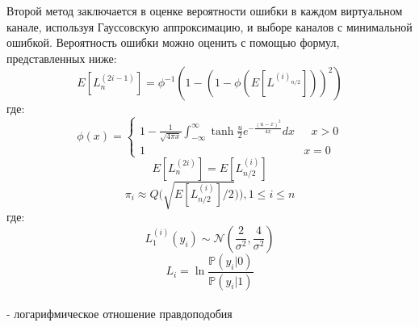 \documentclass[a1paper,portrait,fontscale=0.554]{baposter}
\begin{document}
\begin{poster}
{Второй метод заключается в оценке вероятности ошибки в каждом виртуальном канале, используя Гауссовскую аппроксимацию, и выборе каналов с минимальной ошибкой. Вероятность ошибки можно оценить с помощью формул, представленных ниже: 
\begin{equation}
    E[L^{(2i-1)}_n] = \phi^{-1}(1-(1-\phi(E[L^{(i)_{n/2}}]))^2)
\end{equation}
где:
\begin{equation}
\phi(x) = 
 \begin{cases}
   1 - \frac{1}{\sqrt{4\pi x}}\int_{-\infty}^{\infty}\tanh{\frac{u}{2}}e^{-\frac{(u-x)^2}{4x}}dx &\text{ $x > 0 $}\\
   1 &\text{$x=0$}
 \end{cases}
\end{equation}
\begin{equation}
    E[L^{(2i)}_{n}] = E[L^{(i)}_{n/2}]
\end{equation}
\begin{equation}
    \pi_i \approx Q \Bigg(\sqrt{E[L^{(i)}_{n/2}]/2})\Bigg), 1 \leq i \leq n
\end{equation}
где:
\begin{equation}
    L_1^{(i)}(y_i) \sim  \mathcal{N}(\frac{2}{\sigma^2},\frac{4}{\sigma^2})
\end{equation}
\begin{equation}
    L_{i} = \ln{\frac{\mathds{P}(y_i|0)}{\mathds{P}(y_i|1)}}
\end{equation}
\\
- логарифмическое отношение правдоподобия 

}


\end{poster}
\end{document}
